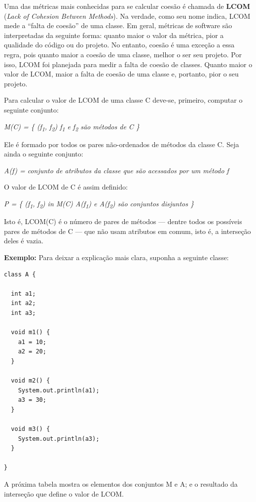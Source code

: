 \documentclass[
  11pt,
  twoside]{book}
\begin{document}
Uma das métricas mais conhecidas para se calcular coesão é chamada de
\textbf{LCOM} (\emph{Lack of Cohesion Between Methods}). Na verdade,
como seu nome indica, LCOM mede a ``falta de coesão'' de uma classe. Em
geral, métricas de software são interpretadas da seguinte forma: quanto
maior o valor da métrica, pior a qualidade do código ou do projeto. No
entanto, coesão é uma exceção a essa regra, pois quanto maior a coesão
de uma classe, melhor o ser seu projeto. Por isso, LCOM foi planejada
para medir a falta de coesão de classes. Quanto maior o valor de LCOM,
maior a falta de coesão de uma classe e, portanto, pior o seu projeto.

Para calcular o valor de LCOM de uma classe C deve-se, primeiro,
computar o seguinte conjunto:

\emph{M(C) = \{ (f\textsubscript{1}, f\textsubscript{2}) \textbar{}
f\textsubscript{1} e f\textsubscript{2} são métodos de C \}}

Ele é formado por todos os pares não-ordenados de métodos da classe C.
Seja ainda o seguinte conjunto:

\emph{A(f) = conjunto de atributos da classe que são acessados por um
método f}

O valor de LCOM de C é assim definido:

\emph{P = \textbar{} \{ (f\textsubscript{1}, f\textsubscript{2}) in M(C)
\textbar{} A(f\textsubscript{1}) e A(f\textsubscript{2}) são conjuntos
disjuntos \} \textbar{}}

Isto é, LCOM(C) é o número de pares de métodos --- dentre todos os
possíveis pares de métodos de C --- que não usam atributos em comum,
isto é, a interseção deles é vazia.

\newpage

\textbf{Exemplo:} Para deixar a explicação mais clara, suponha a
seguinte classe:

\begin{lstlisting}
class A {

  int a1;
  int a2;
  int a3;

  void m1() {
    a1 = 10;
    a2 = 20;
  }

  void m2() {
    System.out.println(a1);
    a3 = 30;
  }

  void m3() {
    System.out.println(a3);
  }

}
\end{lstlisting}

A próxima tabela mostra os elementos dos conjuntos M e A; e o resultado
da interseção que define o valor de LCOM.
\end{document}
